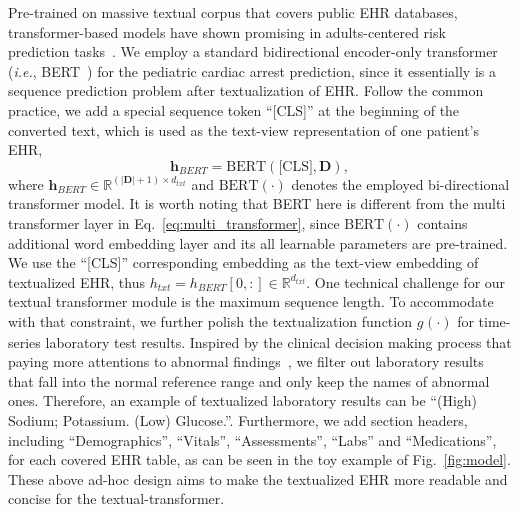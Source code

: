 Pre-trained on massive textual corpus that covers public EHR databases, transformer-based models have shown promising in adults-centered risk prediction tasks~\cite{lu2024UQFM,chen2024adapting,shi2024ehragent}.
We employ a standard bidirectional encoder-only transformer (\textit{i.e.}, BERT~\cite{kenton2019bert}) for the pediatric cardiac arrest prediction, since it essentially is a sequence prediction problem after textualization of EHR. Follow the common practice, we add a special sequence token ``[CLS]'' at the beginning of the converted text, which is used as the text-view representation of one patient's EHR, 
\begin{equation}
\mathbf{h}_{BERT} = \text{BERT}(\text{[CLS]}, \mathbf{D}),
\end{equation}
where $\mathbf{h}_{BERT}\in \mathbb{R}^{(|\mathbf{D}|+1)\times d_{txt}}$ and $\text{BERT}(\cdot)$ denotes the employed bi-directional transformer model. It is worth noting that BERT here is different from the multi transformer layer in Eq.~\eqref{eq:multi_transformer}, since $\text{BERT}(\cdot)$ contains additional word embedding layer and its all learnable parameters are pre-trained. We use the ``[CLS]'' corresponding embedding as the text-view embedding of textualized EHR, thus $h_{txt}=h_{BERT}[0,:] \in \mathbb{R}^{d_{txt}}$.
One technical challenge for our textual transformer module is the maximum sequence length. To accommodate with that constraint, we further polish the textualization function $g_{}(\cdot)$ for time-series laboratory test results. Inspired by the clinical decision making process that paying more attentions to abnormal findings~\cite{jung2009clinical}, we filter out laboratory results that fall into the normal reference range and only keep the names of abnormal ones. Therefore, an example of textualized laboratory results can be ``(High) Sodium; Potassium. (Low) Glucose.''.
Furthermore, we add section headers, including ``Demographics'', ``Vitals'', ``Assessments'', ``Labs'' and ``Medications'',  for each covered EHR table, as can be seen in the toy example of Fig.~\ref{fig:model}. These above ad-hoc design aims to make the textualized EHR more readable and concise for the textual-transformer.

